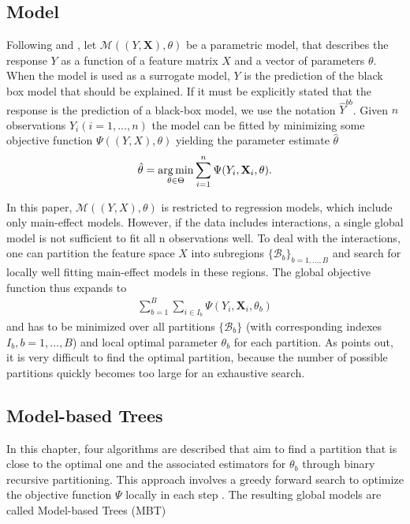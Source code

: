 \subsection{Model}
Following \citep{Zeileis.2008} and \citep{Seibold.2016}, let $\mathcal{M}((Y, \mathbf{X}), \theta)$ be a parametric model, that describes the response $Y$ as a function of a feature matrix $X$  and a vector of parameters $\theta$. When the model is used as a surrogate model, $Y$ is the prediction of the black box model that should be explained.  If it must be explicitly stated that the response is the prediction of a black-box model, we use the notation $\hat{Y}^{bb}$. Given $n$ observations $Y_i(i = 1,...,n)$ the model can be fitted by minimizing some objective function $\Psi((Y, X), \theta)$ yielding the parameter estimate $\hat{\theta}$
\begin{align}
    \hat{\theta} = \operatorname*{arg\,min}_{\theta \in \Theta} \sum_{i=1}^{n}\Psi(Y_{i}, \mathbf{X}_{i}, \theta).
\end{align}

In this paper, $\mathcal{M}((Y, X), \theta)$ is restricted to regression models, which include only main-effect models. However, if the data includes interactions, a single global model is not sufficient to fit all n observations well.  To deal with the interactions, one can partition the feature space $X$ into subregions $\{\mathcal{B}_b\}_{b = 1,...,B}$ and search for locally well fitting main-effect models in these regions. The global objective function thus expands to
\begin{align}
    \sum_{b=1}^B\sum_{i \in I_b}\Psi(Y_{i}, \mathbf{X}_{i}, \theta_b)
\end{align}
and has to be minimized over all partitions $\{\mathcal{B}_b\}$ (with corresponding indexes $I_b, b = 1,...,B$) and local optimal parameter $\theta_b$ for each partition. As \citep{Zeileis.2008} points out, it is very difficult to find the optimal partition, because the number of possible partitions quickly becomes too large for an exhaustive search.





\subsection{Model-based Trees}
In this chapter, four algorithms are described that aim to find a partition that is close to the optimal one and the associated estimators for $\theta_b$ through binary recursive partitioning. This approach involves a greedy forward search to optimize the objective function $\Psi$ locally in each step \citep{Zeileis.2008}.  
The resulting global models are called Model-based Trees (MBT)



